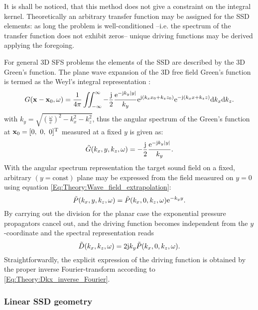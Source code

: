It is shall be noticed, that this method does not give a constraint on the integral kernel. Theoretically an arbitrary transfer function may be assigned for the SSD elements: as long the problem is well-conditioned --i.e. the spectrum of the transfer function does not exhibit zeros-- unique driving functions may be derived applying the foregoing.

\vspace{3mm}
For general 3D SFS problems the elements of the SSD are described by the 3D Green's function. The plane wave expansion of the 3D free field Green's function is termed as the Weyl's integral representation \cite{Williams1999, Lalor1969}:
\begin{equation}
G(\mathbf{x} - \mathbf{x}_0,\omega ) = \frac{1}{4\pi} \iint_{-\infty}^{\infty} -\frac{\mathrm{j}}{2}\frac{\mathrm{e}^{ -\mathrm{j} k_y  | y |  }}{ k_y }
\mathrm{e}^{\mathrm{j} (k_x x_0 + k_z z_0)} \mathrm{e}^{-\mathrm{j} (k_x x + k_z z)} \mathrm{d} k_x \mathrm{d} k_z.
\label{Eq:Theory:Weyls_integra}
\end{equation}
with $k_y = \sqrt{ \left( \frac{\omega}{c} \right )^2 - k_x^2 - k_z^2 }$, thus the angular spectrum of the Green's function at $\mathbf{x}_0 = [0,\ 0,\ 0]^{\mathrm{T}}$ measured at a fixed $y$ is given as:
\begin{equation}
\tilde{G}(k_x,y,k_z,\omega) =-\frac{\mathrm{j}}{2}\frac{\mathrm{e}^{ -\mathrm{j} k_y  | y |  }}{ k_y }.
\end{equation}
With the angular spectrum representation the target sound field on a fixed, arbitrary $(y=\mathrm{const})$ plane may be expressed from the field measured on $y=0$ using equation \eqref{Eq:Theory:Wave_field_extrapolation}:
\begin{equation}
\tilde{P}(k_x,y,k_z,\omega) = \tilde{P}(k_x,0,k_z,\omega) \mathrm{e}^{- k_y y}.
\end{equation}
By carrying out the division for the planar case the exponential pressure propagators cancel out, and the driving function becomes independent from the $y$-coordinate and the spectral representation reads
\begin{equation}
\tilde{D}(k_x,k_z,\omega) = 2\mathrm{j} k_y \tilde{P}(k_x,0,k_z,\omega).
\label{Eq:Theory:Planar_explicit_driv_fun}
\end{equation}
Straightforwardly, the explicit expression of the driving function is obtained by the proper inverse Fourier-transform according to \eqref{Eq:Theory:Dkx_inverse_Fourier}.

\subsubsection{Linear SSD geometry}

